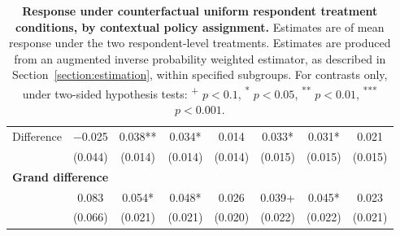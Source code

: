 \begin{table}[H]
{\begin{tabular}{lccccccc}
   \cmidrule(lr){2-8}
 \hspace{1em} Difference & \num{-0.025}& \num{0.038}** & \num{0.034}* & \num{0.014} & \num{0.033}* & \num{0.031}* & \num{0.021}\\
  & (\num{0.044})& (\num{0.014}) & (\num{0.014}) & (\num{0.014}) & (\num{0.015}) & (\num{0.015}) & (\num{0.015})\\
\hline
\multicolumn{4}{l}{\textbf{Grand difference}} \rule{0pt}{1.2\normalbaselineskip} \\
& \num{0.083}&   \num{0.054}* & \num{0.048}* & \num{0.026} & \num{0.039}+ & \num{0.045}* & \num{0.023}\\
  & (\num{0.066}) & (\num{0.021}) & (\num{0.021}) & (\num{0.020}) & (\num{0.022}) & (\num{0.022}) & (\num{0.021})\\
   \end{tabular}
   }
   \caption{\textbf{Response under counterfactual uniform respondent treatment conditions, by contextual policy assignment.} Estimates are of mean response under the two respondent-level treatments. Estimates are produced from an augmented inverse probability weighted estimator, as described in Section~\ref{section:estimation}, within specified subgroups. For contrasts only, under two-sided hypothesis tests: \textsuperscript{+} $p<0.1$, \textsuperscript{*} $p < 0.05$, \textsuperscript{**} $p < 0.01$, \textsuperscript{***} $p < 0.001$.}
   \label{tab:heterogeneity_best}
\end{table}